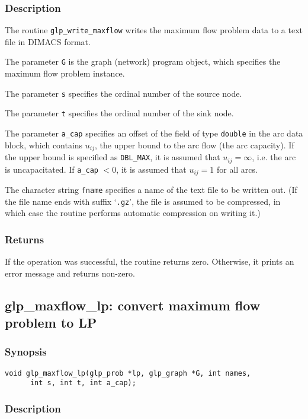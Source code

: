 \subsubsection*{Description}

The routine \verb|glp_write_maxflow| writes the maximum flow problem
data to a text file in DIMACS format.

The parameter \verb|G| is the graph (network) program object, which
specifies the maximum flow problem instance.

The parameter \verb|s| specifies the ordinal number of the source node.

The parameter \verb|t| specifies the ordinal number of the sink node.

The parameter \verb|a_cap| specifies an offset of the field of type
\verb|double| in the arc data block, which contains $u_{ij}$, the upper
bound to the arc flow (the arc capacity). If the upper bound is
specified as \verb|DBL_MAX|, it is assumed that $u_{ij}=\infty$, i.e.
the arc is uncapacitated. If \verb|a_cap| $<0$, it is assumed that
$u_{ij}=1$ for all arcs.

The character string \verb|fname| specifies a name of the text file to
be written out. (If the file name ends with suffix `\verb|.gz|', the
file is assumed to be compressed, in which case the routine performs
automatic compression on writing it.)

\subsubsection*{Returns}

If the operation was successful, the routine returns zero. Otherwise,
it prints an error message and returns non-zero.

\subsection{glp\_maxflow\_lp: convert maximum flow problem to LP}

\subsubsection*{Synopsis}

\begin{verbatim}
void glp_maxflow_lp(glp_prob *lp, glp_graph *G, int names,
      int s, int t, int a_cap);
\end{verbatim}

\subsubsection*{Description}

